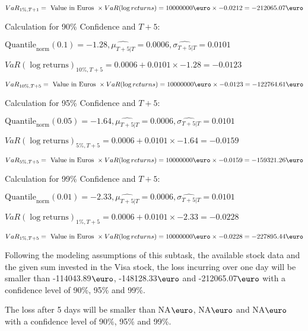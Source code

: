 \indent\indent $VaR_{1\%, T + 1} = \text{ Value in Euros } \times VaR(\log returns) = 10 000 000 \text{\euro} \times-0.0212 = -212065.07 \text{\euro}$\newline




Calculation for 90\% Confidence and $T+5$:

\indent\indent $\text{Quantile}_\text{norm}(0.1) = -1.28,\hat{\mu_{T+5|T}} = 0.0006, \hat{\sigma_{T+5|T}} = 0.0101$

\indent\indent $VaR(\log \text{returns})_{10\%, T + 5} = 0.0006 + 0.0101\times-1.28 = -0.0123$

\indent\indent $VaR_{10\%, T + 5} = \text{ Value in Euros } \times VaR(\log returns) = 10 000 000 \text{\euro} \times-0.0123 = -122764.61 \text{\euro}$\newline




Calculation for 95\% Confidence and $T+5$:

\indent\indent $\text{Quantile}_\text{norm}(0.05) = -1.64,\hat{\mu_{T+5|T}} = 0.0006, \hat{\sigma_{T+5|T}} = 0.0101$

\indent\indent $VaR(\log \text{returns})_{5\%, T + 5} = 0.0006 + 0.0101\times-1.64 = -0.0159$

\indent\indent $VaR_{5\%, T + 5} = \text{ Value in Euros } \times VaR(\log returns) = 10 000 000 \text{\euro} \times-0.0159 = -159321.26 \text{\euro}$\newline




Calculation for 99\% Confidence and $T+5$:

\indent\indent $\text{Quantile}_\text{norm}(0.01) = -2.33,\hat{\mu_{T+5|T}} = 0.0006, \hat{\sigma_{T+5|T}} = 0.0101$

\indent\indent $VaR(\log \text{returns})_{1\%, T + 5} = 0.0006 + 0.0101\times-2.33 = -0.0228$

\indent\indent $VaR_{1\%, T + 5} = \text{ Value in Euros } \times VaR(\log returns) = 10 000 000 \text{\euro} \times-0.0228 = -227895.44 \text{\euro}$\newline


Following the modeling assumptions of this subtask, the available stock data and the given sum invested in the Visa stock, the loss incurring over one day will be smaller than -114043.89$\text{\euro}$, -148128.33$\text{\euro}$  and -212065.07$\text{\euro}$  with a confidence level of 90\%, 95\%  and 99\%.

The loss after 5 days will be smaller than NA$\text{\euro}$, NA$\text{\euro}$  and NA$\text{\euro}$  with a confidence level of 90\%, 95\%  and 99\%.


